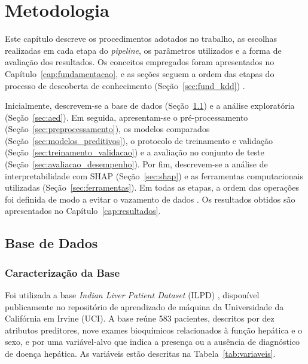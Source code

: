 \chapter{Metodologia} \label{metodologia}

Este capítulo descreve os procedimentos adotados no trabalho, as escolhas realizadas em cada etapa do \textit{pipeline}, os parâmetros utilizados e a forma de avaliação dos resultados. Os conceitos empregados foram apresentados no Capítulo~\ref{cap:fundamentacao}, e as seções seguem a ordem das etapas do processo de descoberta de conhecimento (Seção~\ref{sec:fund_kdd}) \cite{Fayyad1996KDD}.

Inicialmente, descrevem-se a base de dados (Seção~\ref{sec:base_dados}) e a análise exploratória (Seção~\ref{sec:aed}). Em seguida, apresentam-se o pré-processamento (Seção~\ref{sec:preprocessamento}), os modelos comparados (Seção~\ref{sec:modelos_preditivos}), o protocolo de treinamento e validação (Seção~\ref{sec:treinamento_validacao}) e a avaliação no conjunto de teste (Seção~\ref{sec:avaliacao_desempenho}). Por fim, descrevem-se a análise de interpretabilidade com SHAP (Seção~\ref{sec:shap}) e as ferramentas computacionais utilizadas (Seção~\ref{sec:ferramentas}). Em todas as etapas, a ordem das operações foi definida de modo a evitar o vazamento de dados \cite{KaufmanScharRosset2012, KAPOOR2023100804}. Os resultados obtidos são apresentados no Capítulo~\ref{cap:resultados}.

\section{Base de Dados}
\label{sec:base_dados}

\subsection{Caracterização da Base}
\label{sec:caracterizacao_base}

Foi utilizada a base \textit{Indian Liver Patient Dataset} (ILPD) \cite{ramana2022ilpd}, disponível publicamente no repositório de aprendizado de máquina da Universidade da Califórnia em Irvine (UCI). A base reúne 583 pacientes, descritos por dez atributos preditores, nove exames bioquímicos relacionados à função hepática e o sexo, e por uma variável-alvo que indica a presença ou a ausência de diagnóstico de doença hepática. As variáveis estão descritas na Tabela~\ref{tab:variaveis}.

